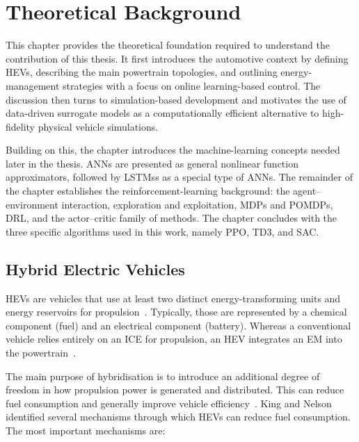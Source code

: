 \chapter{Theoretical Background}
\label{chap:theory}

This chapter provides the theoretical foundation required to understand the contribution of this thesis. It first introduces the automotive context by defining \acp{HEV}, describing the main powertrain topologies, and outlining energy-management strategies with a focus on online learning-based control. The discussion then turns to simulation-based development and motivates the use of data-driven surrogate models as a computationally efficient alternative to high-fidelity physical vehicle simulations.

Building on this, the chapter introduces the machine-learning concepts needed later in the thesis. \acp{ANN} are presented as general nonlinear function approximators, followed by \acp{LSTM}s as a special type of \ac{ANN}s. The remainder of the chapter establishes the reinforcement-learning background: the agent--environment interaction, exploration and exploitation, \acp{MDP} and \acp{POMDP}, \ac{DRL}, and the actor--critic family of methods. The chapter concludes with the three specific algorithms used in this work, namely \ac{PPO}, \ac{TD3}, and \ac{SAC}.

\section{Hybrid Electric Vehicles}
\acp{HEV} are vehicles that use at least two distinct energy-transforming units and energy reservoirs for propulsion~\cite{world_forum_for_harmonisation_of_vehicle_regulations_wp29_mutual_2015}. Typically, those are represented by a chemical component (fuel) and an electrical component (battery). Whereas a conventional vehicle relies entirely on an \ac{ICE} for propulsion, an HEV integrates an \ac{EM} into the powertrain~\cite{kebriaei_hybrid_2015}.

The main purpose of hybridisation is to introduce an additional degree of freedom in how propulsion power is generated and distributed. This can reduce fuel consumption and generally improve vehicle efficiency~\cite{serrao_comparative_2011}. King and Nelson~\cite{king_model-based_2013} identified several mechanisms through which HEVs can reduce fuel consumption. The most important mechanisms are:

